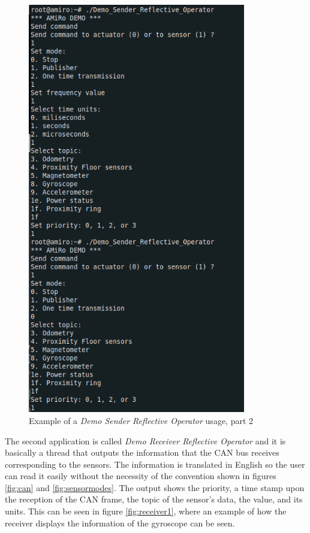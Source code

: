 \documentclass[12pt]{report}%
\begin{document}
\begin{figure}[h]
 \centering
 \includegraphics[width=\textwidth, height=18cm]{sender_example}
		\caption{Example of a \textit{Demo Sender Reflective Operator} usage, part 2}
		\label{fig:sender2}
\end{figure}

The second application is called \textit{Demo Receiver Reflective Operator} and it is basically a thread that outputs the information that the CAN bus receives corresponding to the sensors. The information is translated in English so the user can read it easily without the necessity of the convention shown in figures \ref{fig:can} and \ref{fig:sensormodes}. The output shows the priority, a time stamp upon the reception of the CAN frame, the topic of the sensor's data, the value, and its units. This can be seen in figure \ref{fig:receiver1}, where an example of how the receiver displays the information of the gyroscope can be seen.
\end{document}
